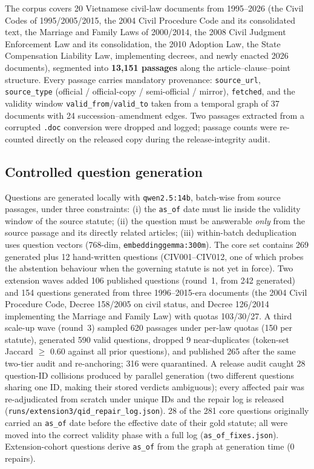 \documentclass[10pt,a4paper,twocolumn]{article}
\newcommand{\code}[1]{\texttt{#1}}
\begin{document}
The corpus covers 20 Vietnamese civil-law documents from 1995--2026 (the Civil Codes of 1995/2005/2015, the 2004 Civil Procedure Code and its consolidated text, the Marriage and Family Laws of 2000/2014, the 2008 Civil Judgment Enforcement Law and its consolidation, the 2010 Adoption Law, the State Compensation Liability Law, implementing decrees, and newly enacted 2026 documents), segmented into \textbf{13{,}151 passages} along the article--clause--point structure. Every passage carries mandatory provenance: \code{source\_url}, \code{source\_type} (official / official-copy / semi-official / mirror), \code{fetched}, and the validity window \code{valid\_from}/\code{valid\_to} taken from a temporal graph of 37 documents with 24 succession--amendment edges. Two passages extracted from a corrupted \code{.doc} conversion were dropped and logged; passage counts were re-counted directly on the released copy during the release-integrity audit.

\subsection{Controlled question generation}
\label{sec:gen}

Questions are generated locally with \code{qwen2.5:14b}, batch-wise from source passages, under three constraints: (i) the \code{as\_of} date must lie inside the validity window of the source statute; (ii) the question must be answerable \emph{only} from the source passage and its directly related articles; (iii) within-batch deduplication uses question vectors (768-dim, \code{embeddinggemma:300m}). The core set contains 269 generated plus 12 hand-written questions (CIV001--CIV012, one of which probes the abstention behaviour when the governing statute is not yet in force). Two extension waves added 106 published questions (round~1, from 242 generated) and 154 questions generated from three 1996--2015-era documents (the 2004 Civil Procedure Code, Decree 158/2005 on civil status, and Decree 126/2014 implementing the Marriage and Family Law) with quotas 103/30/27. A third scale-up wave (round~3) sampled 620 passages under per-law quotas (150 per statute), generated 590 valid questions, dropped 9 near-duplicates (token-set Jaccard $\ge$ 0.60 against all prior questions), and published 265 after the same two-tier audit and re-anchoring; 316 were quarantined. A release audit caught 28 question-ID collisions produced by parallel generation (two different questions sharing one ID, making their stored verdicts ambiguous); every affected pair was re-adjudicated from scratch under unique IDs and the repair log is released (\code{runs/extension3/qid\_repair\_log.json}). 28 of the 281 core questions originally carried an \code{as\_of} date before the effective date of their gold statute; all were moved into the correct validity phase with a full log (\code{as\_of\_fixes.json}). Extension-cohort questions derive \code{as\_of} from the graph at generation time (0 repairs).
\end{document}
